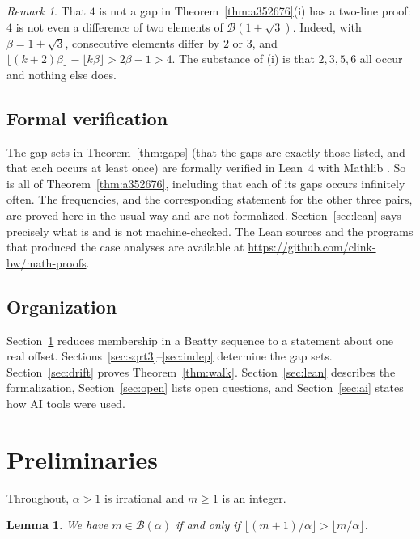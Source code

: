 \documentclass[12pt]{article}
\newcommand{\fl}[1]{\lfloor #1 \rfloor}
\newcommand{\B}{\mathcal{B}}
\theoremstyle{plain}
\newtheorem{lemma}[theorem]{Lemma}
\theoremstyle{remark}
\newtheorem{remark}[theorem]{Remark}
\begin{document}
\begin{remark}\label{rem:four}
That $4$ is not a gap in Theorem~\ref{thm:a352676}(i) has a two-line proof: $4$ is not even a
difference of two elements of $\B(1+\sqrt3)$. Indeed, with $\beta=1+\sqrt3$, consecutive
elements differ by $2$ or $3$, and $\fl{(k+2)\beta}-\fl{k\beta}>2\beta-1>4$. The substance of
(i) is that $2,3,5,6$ all occur and nothing else does.
\end{remark}

\subsection*{Formal verification}

The gap sets in Theorem~\ref{thm:gaps} (that the gaps are exactly those listed, and that each
occurs at least once) are formally verified in Lean~4 \cite{lean4} with Mathlib \cite{mathlib}.
So is all of Theorem~\ref{thm:a352676}, including that each of its gaps occurs infinitely
often. The frequencies, and the corresponding statement for the other three pairs, are proved here
in the usual way and are not formalized.
Section~\ref{sec:lean} says precisely what is and is not machine-checked. The Lean sources and
the programs that produced the case analyses are available at
\url{https://github.com/clink-bw/math-proofs}.

\subsection*{Organization}

Section~\ref{sec:prelim} reduces membership in a Beatty sequence to a statement about one real
offset. Sections~\ref{sec:sqrt3}--\ref{sec:indep} determine the gap sets.
Section~\ref{sec:drift} proves Theorem~\ref{thm:walk}. Section~\ref{sec:lean} describes the
formalization, Section~\ref{sec:open} lists open questions, and Section~\ref{sec:ai} states how
AI tools were used.

\section{Preliminaries}\label{sec:prelim}

Throughout, $\alpha>1$ is irrational and $m\ge1$ is an integer.

\begin{lemma}\label{lem:member}
We have $m\in\B(\alpha)$ if and only if $\fl{(m+1)/\alpha}>\fl{m/\alpha}$.
\end{lemma}
\end{document}
